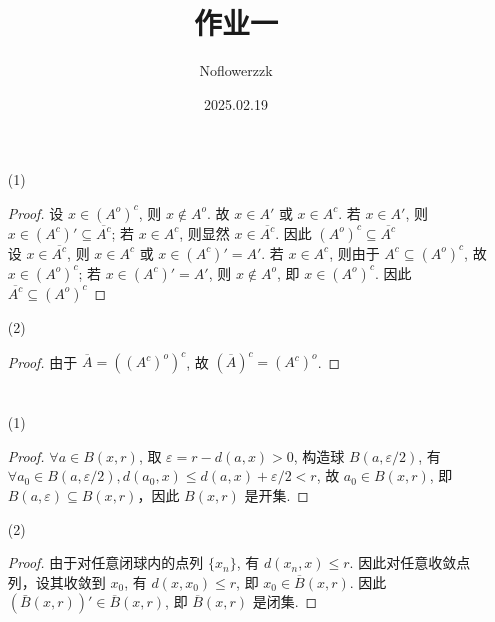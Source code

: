 \documentclass{article}
\title{作业一}
\author{Noflowerzzk}
\date{2025.02.19}
\begin{document}
\maketitle

\section{}

\begin{itemize}
    \item [(1)]
    \begin{proof}
        设 $x \in (A^o)^c$, 则 $x \notin A^o$. 故 $x \in A'$ 或 $x \in A^c$. 若 $x \in A'$, 则 $x \in (A^c)' \subseteq \overline{A^c}$; 若 $x \in A^c$, 则显然 $x \in \overline{A^c}$. 因此 $(A^o)^c \subseteq \overline{A^c}$ \\
        设 $x \in \overline{A^c}$, 则 $x \in A^c$ 或 $x \in (A^c)' = A'$. 若 $x \in A^c$, 则由于 $A^c \subseteq (A^o)^c$, 故 $x \in (A^o)^c$; 若 $x \in (A^c)' = A'$, 则 $x \notin A^o$, 即 $x \in (A^o)^c$. 因此 $\overline{A^c} \subseteq (A^o)^c $
    \end{proof}
    \item [(2)]
    \begin{proof}
        由于 $\overline{A} = ((A^c)^o)^c$, 故 $(\overline{A})^c = (A^c)^o$.
    \end{proof}
\end{itemize}

\section{}

\begin{itemize}
    \item [(1)]
    \begin{proof}
        $\forall a \in B(x, r)$, 取 $\varepsilon = r - d(a, x) > 0$, 构造球 $B(a, \varepsilon/2)$, 有 $\forall a_0 \in B(a, \varepsilon / 2), d(a_0, x) \leqslant d(a, x) + \varepsilon / 2 < r$, 故 $a_0 \in B(x, r)$, 即 $B(a, \varepsilon) \subseteq B(x, r)$，因此 $B(x, r)$ 是开集.
    \end{proof}
    \item [(2)]
    \begin{proof}
        由于对任意闭球内的点列 $\{x_n\}$, 有 $d(x_n, x) \leqslant r$. 因此对任意收敛点列，设其收敛到 $x_0$, 有 $d(x, x_0) \leqslant r$, 即 $x_0 \in \overline{B}(x, r)$. 因此 $(\bar{B}(x, r))' \in \overline{B}(x, r)$, 即 $\overline{B}(x, r)$ 是闭集.
    \end{proof}
\end{itemize}
\end{document}

